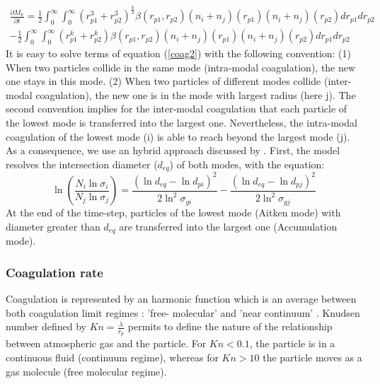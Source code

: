  \begin{eqnarray}
\frac{\partial M_k}{\partial t} = \frac{1}{2} \int_{0}^{\infty} 
\int_{0}^{\infty} (r_{p1}^3 + r_{p2}^3)^{\frac{k}{3}}
\beta(r_{p1},r_{p2}) (n_i + n_j)(r_{p1}) (n_i + n_j)(r_{p2}) dr_{p1} dr_{p2} 
\nonumber \\
- \frac{1}{2} \int_{0}^{\infty} \int_{0}^{\infty}
(r_{p1}^k + r_{p2}^k)  \beta(r_{p1},r_{p2}) (n_i + n_j)(r_{p1}) (n_i + 
n_j)(r_{p2}) dr_{p1} dr_{p2}
\label{coag2}
\end{eqnarray}
It is easy to solve terms of equation (\ref{coag2}) with the following convention:
(1) When two particles collide in the same mode (intra-modal coagulation), the 
new one stays in this mode.
(2) When two particles of different modes collide (inter-modal coagulation), the 
new one 
is in the mode with largest radius (here j).
The second convention implies for the inter-modal coagulation that each 
particle of the lowest
mode is transferred into the largest one.
Nevertheless, the intra-modal coagulation of the lowest mode (i) is able to 
reach beyond the largest mode (j). As a consequence, we use an hybrid approach 
discussed by \citet{Ackermann1998}. First, the model resolves the intersection 
diameter ($d_{eq}$) of both modes, with the equation:
 \begin{equation}
 \ln \left(\frac{N_i \ln \sigma_i}{N_j \ln \sigma_j}\right) = \frac{(\ln d_{eq} 
- \ln d_{pi})^2}{2\ln^2 \sigma_{gi}} - \frac{(\ln d_{eq} - \ln d_{pj})^2}{2\ln^2 
\sigma_{gj}}
\label{coag3}
\end{equation}
At the end of the time-step, particles of the lowest mode (Aitken mode) with diameter greater than  $d_{eq}$
are transferred into the largest one (Accumulation mode).

\subsubsection*{Coagulation rate}
Coagulation is represented by an harmonic function which is an
average between both coagulation limit regimes : 'free-
molecular' and 'near continuum' \citep{Whitby1991}. Knudsen number defined by  $Kn = 
\frac{\lambda}{r_p}$ permits to define
the nature of the relationship between atmospheric gas and the particle. For $Kn < 
0.1$, the particle is in a continuous fluid (continuum regime), whereas for $Kn > 
10$  the particle moves as a gas molecule (free molecular regime).

